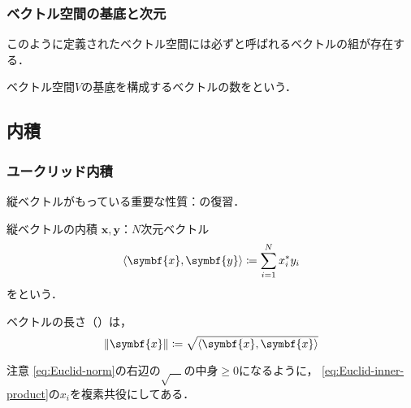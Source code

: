 \documentclass[
    10pt,
    ]{sotsu-beamer}
\begin{document}
\begin{frame}
    \frametitle{ベクトル空間の基底と次元}

    このように定義されたベクトル空間には必ずと呼ばれるベクトルの組が存在する．
    
    ベクトル空間$V$の基底を構成するベクトルの数をという．

\end{frame}


\subsection{内積}

\begin{frame}
    \frametitle{ユークリッド内積}

    縦ベクトルがもっている重要な性質：の復習．

    \pause 

    \begin{block}{縦ベクトルの内積}
        $\symbf{x}, \symbf{y}$：$N$次元ベクトル
        \begin{equation}
            \label{eq:Euclid-inner-product}
            \iparen{\symbf{x}, \symbf{y}}
                \coloneq \sum_{i=1}^{N} x_i^* y_i
        \end{equation}
        をという．
    \end{block}

    ベクトルの長さ（）は，
    \begin{equation}
        \label{eq:Euclid-norm}
        \norm{\symbf{x}} \coloneq \sqrt{\iparen{\symbf{x}, \symbf{x}}}
    \end{equation}

    \begin{alertblock}{注意}
        \eqref{eq:Euclid-norm}の右辺の$\sqrt{\quad}$の中身$\geq 0$になるように，
        \eqref{eq:Euclid-inner-product}の$x_i$を複素共役にしてある．
    \end{alertblock}

\end{frame}
\end{document}
